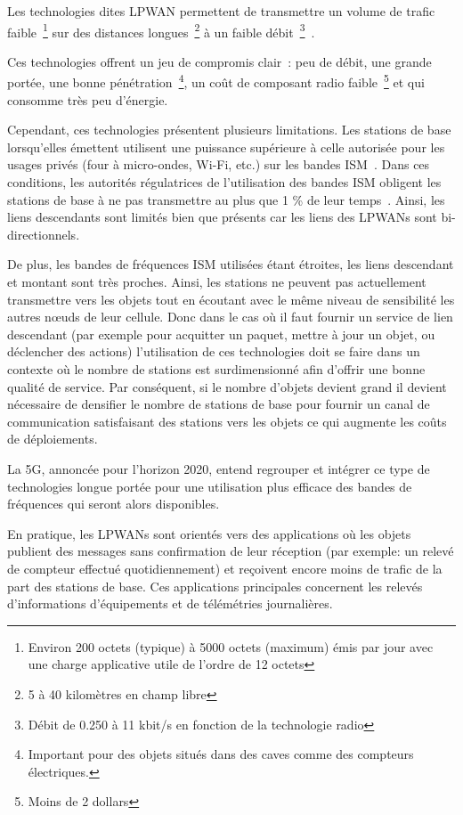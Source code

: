 Les technologies dites \ac{LPWAN} permettent de transmettre un volume de trafic faible~\footnote{Environ 200 octets (typique) à 5000 octets (maximum) émis par jour avec une charge applicative utile de l'ordre de 12 octets} sur des distances longues~\footnote{5 à 40 kilomètres en champ libre} à un faible débit~\footnote{Débit de 0.250 à 11 kbit/s en fonction de la technologie radio}~\cite{xiong2015low}.

Ces technologies offrent un jeu de compromis clair~: peu de débit, une grande portée, une bonne pénétration~\footnote{Important pour des objets situés dans des caves comme des compteurs électriques.}, un coût de composant radio faible~\footnote{Moins de 2 dollars} et qui consomme très peu d'énergie.

Cependant, ces technologies présentent plusieurs limitations.
Les stations de base lorsqu'elles émettent utilisent une puissance supérieure à celle autorisée pour les usages privés (four à micro-ondes, Wi-Fi, etc.) sur les bandes \ac{ISM}~\cite{rec200170}.
Dans ces conditions, les autorités régulatrices de l'utilisation des bandes \ac{ISM} obligent les stations de base à ne pas transmettre au plus que 1 \% de leur temps~\cite{vangelista2015long}.
Ainsi, les liens descendants sont limités bien que présents car les liens des \ac{LPWAN}s sont bi-directionnels.

De plus, les bandes de fréquences \ac{ISM} utilisées étant étroites, les liens descendant et montant sont très proches.
Ainsi, les stations ne peuvent pas actuellement transmettre vers les objets tout en écoutant avec le même niveau de sensibilité les autres nœuds de leur cellule.
Donc dans le cas où il faut fournir un service de lien descendant (par exemple pour acquitter un paquet, mettre à jour un objet, ou déclencher des actions) l'utilisation de ces technologies doit se faire dans un contexte où le nombre de stations est surdimensionné afin d'offrir une bonne qualité de service.
Par conséquent, si le nombre d'objets devient grand il devient nécessaire de densifier le nombre de stations de base pour fournir un canal de communication satisfaisant des stations vers les objets ce qui augmente les coûts de déploiements.

La 5G, annoncée pour l'horizon 2020, entend regrouper et intégrer ce type de technologies longue portée pour une utilisation plus efficace des bandes de fréquences qui seront alors disponibles.

En pratique, les \ac{LPWAN}s sont orientés vers des applications où les objets publient des messages sans confirmation de leur réception (par exemple: un relevé de compteur effectué quotidiennement) et reçoivent encore moins de trafic de la part des stations de base.
Ces applications principales concernent les relevés d'informations d'équipements et de télémétries journalières.

